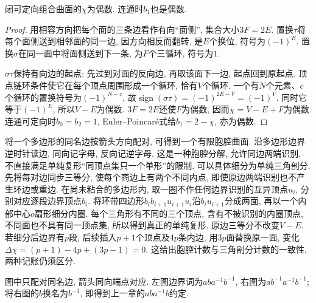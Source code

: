 \begin{proposition}\label{thm:orientable-even}
闭可定向组合曲面的$\chi$为偶数. 连通时$b_1$也是偶数.
\end{proposition}
\begin{proof}
用相容方向把每个面的三条边看作有向“面侧”, 集合大小$3F=2E$. 置换$\tau$将每个面侧送到相邻面的同一边, 因方向相反而翻转, 是$E$个换位, 符号为$(-1)^E$. 置换$\sigma$在同一面中将面侧送到下一条, 为$F$个三循环, 符号为$1$.

$\sigma\tau$保持有向边的起点: 先过到对面的反向边, 再取该面下一边, 起点回到原起点. 顶点链环条件使它在每个顶点周围形成一个循环, 恰有$V$个循环. 一个有$N$个元素、$c$个循环的置换符号为$(-1)^{N-c}$, 故$\operatorname{sign}(\sigma\tau)=(-1)^{2E-V}=(-1)^V$. 同时它等于$(-1)^E$, 所以$V-E$为偶数. $3F=2E$还使$F$为偶数, 因而$\chi=V-E+F$为偶数. 连通可定向时$b_0=b_2=1$, Euler--Poincar\'e式给$b_1=2-\chi$, 亦为偶数.
\end{proof}

将一个多边形的同名边按箭头方向配对, 可得到一个有限胞腔曲面. 沿多边形边界逆时针读边, 同向记字母, 反向记逆字母. 这是一种胞腔分解, 允许同边两端识别, 不直接满足单纯复形“同顶点集只一个单形”的限制. 可以具体细分为单纯三角剖分. 先将每对边同步三等分, 使每个商边上有两个不同内点, 即使原边两端识别也不产生环边或重边. 在尚未粘合的多边形内, 取一圈不作任何边界识别的互异顶点$u_i$, 分别对应逐段边界顶点$b_i$. 将环带四边形$b_i b_{i+1}u_{i+1}u_i$沿$b_i u_{i+1}$分成两面, 再以一个内部中心$o$扇形细分内圈. 每个三角形有不同的三个顶点, 含有不被识别的内圈顶点, 不同面也不具有同一顶点集, 所以得到真正的单纯复形. 原边三等分不改变$V-E$. 若细分后边界有$p$段, 后续插入$p+1$个顶点及$4p$条内边, 用$3p$面替换原一面, 变化$\Delta\chi=(p+1)-4p+(3p-1)=0$. 这给出胞腔计数与三角剖分计数的一致性, 两种记账仍须区分.

\begin{center}
\end{center}
\noindent 图中只配对同名边, 箭头同向端点对应. 左图边界词为$aba^{-1}b^{-1}$, 右图为$ab^{-1}a^{-1}b^{-1}$; 将右图的$b$换名为$b^{-1}$, 即得到上一章的$aba^{-1}b$约定.

